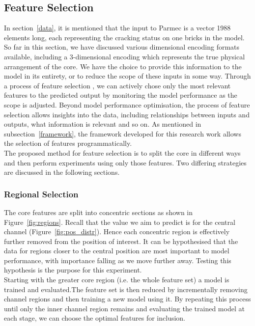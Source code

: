 \subsection{Feature Selection} \label{feature_selection}

In section~\ref{data}, it is mentioned that the input to Parmec is a vector 1988 elements long, each representing the cracking status on one bricks in the model. So far in this section, we have discussed various dimensional encoding formats available, including a 3-dimensional encoding which represents the true physical arrangement of the core. We have the choice to provide this information to the model in its entirety, or to reduce the scope of these inputs in some way. Through a process of feature selection \cite{gurney1997introduction}, we can actively chose only the most relevant features to the predicted output by monitoring the model performance as the scope is adjusted. Beyond model performance optimisation, the process of feature selection allows insights into the data, including relationships between inputs and outputs, what information is relevant and so on. As mentioned in subsection~\ref{framework}, the framework developed for this research work allows the selection of features programmatically. 
\\

\noindent
The proposed method for feature selection is to split the core in different ways and then perform experiments using only those features. Two differing strategies are discussed in the following sections.

\subsubsection{Regional Selection} \label{regional_selection}

The core features are split into concentric sections as shown in Figure~\ref{fig:regions}.  Recall that the value we aim to predict is for the central channel (Figure~\ref{fig:pos_distr}). Hence each concentric region is effectively further removed from the position of interest. It can be hypothesised that the data for regions closer to the central position are most important to model performance, with importance falling as we move further away. Testing this hypothesis is the purpose for this experiment.
\\

\noindent
Starting with the greater core region (i.e. the whole feature set) a model is trained and evaluated.The feature set is then reduced by incrementally removing channel regions and then training a new model using it. By repeating this process until only the inner channel region remains and evaluating the trained model at each stage, we can choose the optimal features for inclusion.

